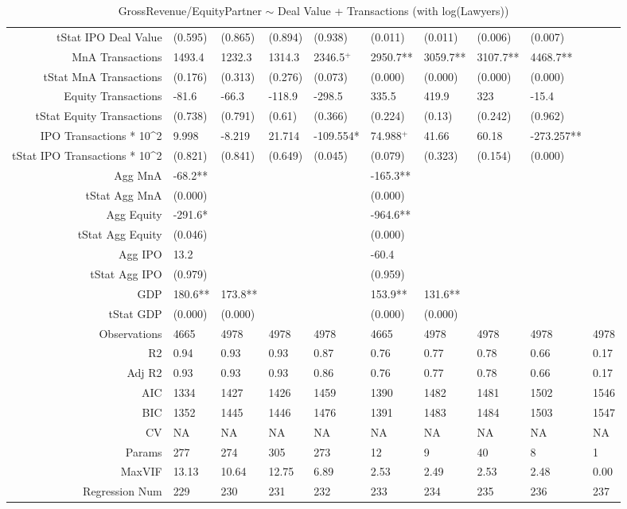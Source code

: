 \begin{table}[ht]
\begin{tabular}{rlllllllll}
  tStat IPO Deal Value & (0.595) & (0.865) & (0.894) & (0.938) & (0.011) & (0.011) & (0.006) & (0.007) &  \\ 
  MnA Transactions & 1493.4 & 1232.3 & 1314.3 & 2346.5$^{+}$ & 2950.7** & 3059.7** & 3107.7** & 4468.7** &  \\ 
  tStat MnA Transactions & (0.176) & (0.313) & (0.276) & (0.073) & (0.000) & (0.000) & (0.000) & (0.000) &  \\ 
  Equity Transactions & -81.6 & -66.3 & -118.9 & -298.5 & 335.5 & 419.9 & 323 & -15.4 &  \\ 
  tStat Equity Transactions & (0.738) & (0.791) & (0.61) & (0.366) & (0.224) & (0.13) & (0.242) & (0.962) &  \\ 
  IPO Transactions * 10^2 & 9.998 & -8.219 & 21.714 & -109.554* & 74.988$^{+}$ & 41.66 & 60.18 & -273.257** &  \\ 
  tStat IPO Transactions * 10^2 & (0.821) & (0.841) & (0.649) & (0.045) & (0.079) & (0.323) & (0.154) & (0.000) &  \\ 
  Agg MnA & -68.2** &  &  &  & -165.3** &  &  &  &  \\ 
  tStat Agg MnA & (0.000) &  &  &  & (0.000) &  &  &  &  \\ 
  Agg Equity & -291.6* &  &  &  & -964.6** &  &  &  &  \\ 
  tStat Agg Equity & (0.046) &  &  &  & (0.000) &  &  &  &  \\ 
  Agg IPO & 13.2 &  &  &  & -60.4 &  &  &  &  \\ 
  tStat Agg IPO & (0.979) &  &  &  & (0.959) &  &  &  &  \\ 
  GDP & 180.6** & 173.8** &  &  & 153.9** & 131.6** &  &  &  \\ 
  tStat GDP & (0.000) & (0.000) &  &  & (0.000) & (0.000) &  &  &  \\ 
  Observations & 4665 & 4978 & 4978 & 4978 & 4665 & 4978 & 4978 & 4978 & 4978 \\ 
  R2 & 0.94 & 0.93 & 0.93 & 0.87 & 0.76 & 0.77 & 0.78 & 0.66 & 0.17 \\ 
  Adj R2 & 0.93 & 0.93 & 0.93 & 0.86 & 0.76 & 0.77 & 0.78 & 0.66 & 0.17 \\ 
  AIC & 1334 & 1427 & 1426 & 1459 & 1390 & 1482 & 1481 & 1502 & 1546 \\ 
  BIC & 1352 & 1445 & 1446 & 1476 & 1391 & 1483 & 1484 & 1503 & 1547 \\ 
  CV & NA & NA & NA & NA & NA & NA & NA & NA & NA \\ 
  Params & 277 & 274 & 305 & 273 & 12 & 9 & 40 & 8 & 1 \\ 
  MaxVIF & 13.13 & 10.64 & 12.75 & 6.89 & 2.53 & 2.49 & 2.53 & 2.48 & 0.00 \\ 
  Regression Num & 229 & 230 & 231 & 232 & 233 & 234 & 235 & 236 & 237 \\ 
   \hline
\end{tabular}
\caption{GrossRevenue/EquityPartner $\sim$ Deal Value + Transactions (with log(Lawyers))} 
\end{table}
